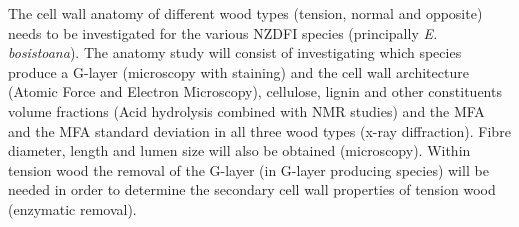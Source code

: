 The cell wall anatomy of different wood types (tension, normal and opposite)
needs to be investigated for the various NZDFI species (principally \textit{E.
bosistoana}). The anatomy study will consist of investigating which species
produce a G-layer (microscopy with staining) and the cell wall architecture
(Atomic Force and Electron Microscopy), cellulose, lignin and other constituents
volume fractions (Acid hydrolysis combined with NMR studies)  and the MFA and
the MFA standard deviation in all three wood types (x-ray diffraction). Fibre
diameter, length and lumen size will also be obtained (microscopy). Within
tension wood the removal of the G-layer (in G-layer producing species) will be
needed in order to determine the secondary cell wall properties of tension wood
(enzymatic removal).